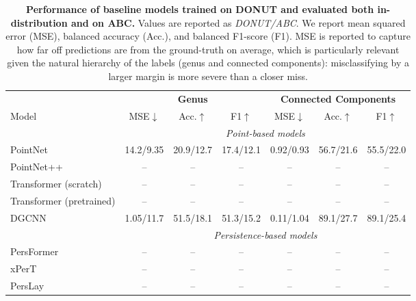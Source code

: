 \begin{table}[h]
\centering
\begin{tabular}{l|ccc|ccc}
\toprule
 & \multicolumn{3}{c|}{\textbf{Genus}} & \multicolumn{3}{c}{\textbf{Connected Components}} \\
Model & MSE$\downarrow$ & Acc.$\uparrow$ & F1$\uparrow$ & MSE$\downarrow$ & Acc.$\uparrow$ & F1$\uparrow$ \\
\midrule
\multicolumn{1}{l}{} & \multicolumn{6}{c}{\textit{Point-based models}} \\
\midrule
PointNet~\cite{pointnet}   & 14.2/9.35 & 20.9/12.7 & 17.4/12.1 & 0.92/0.93 & 56.7/21.6 & 55.5/22.0 \\
PointNet++~\cite{pointnet++} &  -- & -- & -- & -- & -- & -- \\
Transformer (scratch) & -- & -- & -- & -- & -- & -- \\
Transformer (pretrained) & -- & -- & -- & -- & -- & -- \\
DGCNN~\cite{dgcnn}      & 1.05/11.7 & 51.5/18.1 & 51.3/15.2 & 0.11/1.04 & 89.1/27.7 & 89.1/25.4 \\
\midrule
\multicolumn{1}{l}{} & \multicolumn{6}{c}{\textit{Persistence-based models}} \\
\midrule
PersFormer~\cite{persformer} & -- & -- & -- & -- & -- & -- \\
xPerT~\cite{xpert}      & -- & -- & -- & -- & -- & -- \\
PersLay~\cite{perslay}    & -- & -- & -- & -- & -- & -- \\
\bottomrule
\end{tabular}
\caption{\textbf{Performance of baseline models trained on DONUT and evaluated both in-distribution and on ABC.} Values are reported as \textit{DONUT/ABC}. We report mean squared error (MSE), balanced accuracy (Acc.), and balanced F1-score (F1). MSE is reported to capture how far off predictions are from the ground-truth on average, which is particularly relevant given the natural hierarchy of the labels (genus and connected components): misclassifying by a larger margin is more severe than a closer miss. }
\label{tab:topogen-results}
\end{table}